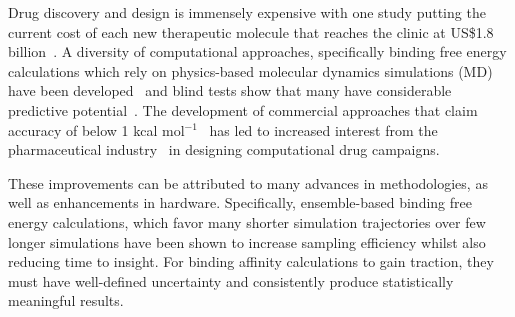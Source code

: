 



Drug discovery and design is immensely expensive with one study putting the
current cost of each new therapeutic molecule that reaches the clinic at
US\$1.8 billion~\cite{Paul2010}. A diversity of computational approaches,
specifically binding free energy calculations which rely on physics-based
molecular dynamics simulations (MD) have been developed~\cite{Mobley2012} and
blind tests show that many have considerable predictive
potential~\cite{Mey2017,Yin2017}. The development of commercial approaches
that claim accuracy of below 1 kcal mol$^{-1}$~\cite{Wang2015} has led to
increased interest from the pharmaceutical industry~\cite{Ganesan2017} in
designing computational drug campaigns.



These improvements can be attributed to many advances in methodologies, as
well as enhancements in hardware. Specifically, ensemble-based binding free
energy calculations, which favor many shorter simulation trajectories over few
longer simulations have been shown to increase sampling efficiency whilst also
reducing time to insight.  For binding affinity
calculations to gain traction, they must have well-defined uncertainty and
consistently produce statistically meaningful results.

